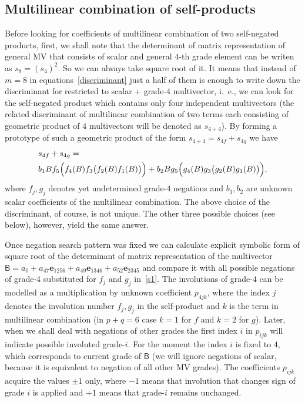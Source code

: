 \documentclass{birkjour}
\newcommand{\e}[1]{\mathbf{e}_{#1}} %
\def\m#1{\mathsf{#1}} %
\begin{document}
\subsection{Multilinear combination of self-products\label{sec:4b}}

Before looking for coefficients of multilinear combination of two
self-negated products, first, we shall note that the determinant
of matrix representation of general MV that consists of scalar and general
$4$-th grade element can be writen as $s_8=(s_4)^2$. So we can always take square
root of it. It means that instead of $m=8$ in
equations~\eqref{discriminant} just a half of them is enough to
write down the discriminant for restricted to scalar + grade-$4$
multivector, i.~e., we can look for the self-negated product which
contains only four independent multivectors (the related
discriminant of multilinear combination of two terms each
consisting of geometric product of $4$ multivectors will be
denoted as $s_{4+4}$). By forming a prototype of such a geometric product of the
form $s_{4+4}=s_{4f} +s_{4g}$ we have
\begin{equation}\begin{split}
 &s_{4f}+s_{4g}=\\
 &b_1 B f_5\Bigl(f_4(B) f_3\bigl(f_2(B) f_1(B)\bigr)\Bigr)
 +b_2 B g_5\Bigl(g_4(B) g_3\bigl(g_2(B)
  g_1(B)\bigr)\Bigr)\label{s1},
\end{split}\end{equation}
where $f_j, g_j$ denotes yet undetermined grade-$4$ negations and
$b_1, b_2$ are unknown scalar coefficients of the multilinear
combination. The above  choice of the discriminant, of course, is
not unique. The other three possible choices (see below), however, yield the same answer.

Once negation search pattern was fixed we can calculate explicit
symbolic form of square root of the determinant of matrix
representation of the multivector $\m{B}=a_{0}+a_{47}
\e{1256}+a_{49} \e{1346}+a_{52} \e{2345}$ and compare it with
 all possible negations of grade-$4$ substituted for $f_j$ and $g_j$ in~\eqref{s1}.
The involutions of grade-$4$ can be modelled as a multiplication
by unknown coefficient $p_{4jk}$, where the index $j$ denotes the
involution number $f_j,g_j$ in the self-product and $k$ is the
term in multilinear combination (in $p+q=6$ case $k=1$ for $f$ and
$k=2$ for $g$). Later, when we shall deal with negations of other
grades the first index $i$ in $p_{ijk}$ will indicate possible
involuted grade-$i$. For the moment the index $i$ is fixed to $4$,
which corresponds  to current grade of $\m{B}$ (we will ignore
negations of scalar, because it is equivalent to negation of all
other MV grades). The coefficients $p_{ijk}$ acquire the values
$\pm 1$ only, where $-1$ means that involution that changes sign
of grade $i$ is applied and $+1$ means that grade-$i$ remains
unchanged.
\end{document}
